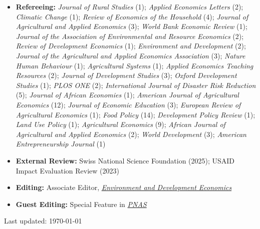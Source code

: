 \documentclass[letterpaper]{article}
\def\footerlink{}
\begin{document}
\begin{itemize}

\item \textbf{Refereeing:} \emph{Journal of Rural Studies} (1); \emph{Applied Economics Letters} (2); \emph{Climatic Change} (1); \emph{Review of Economics of the Household} (4); \emph{Journal of Agricultural and Applied Economics} (3); \emph{World Bank Economic Review} (1); \emph{Journal of the Association of Environmental and Resource Economics} (2); \emph{Review of Development Economics} (1); \emph{Environment and Development} (2); \emph{Journal of the Agricultural and Applied Economics Association} (3); \emph{Nature Human Behaviour} (1); \emph{Agricultural Systems} (1); \emph{Applied Economics Teaching Resources} (2); \emph{Journal of Development Studies} (3); \emph{Oxford Development Studies} (1); \emph{PLOS ONE} (2); \emph{International Journal of Disaster Risk Reduction} (5); \emph{Journal of African Economies} (1); \emph{American Journal of Agricultural Economics} (12); \emph{Journal of Economic Education} (3); \emph{European Review of Agricultural Economics} (1); \emph{Food Policy} (14); \emph{Development Policy Review} (1); \emph{Land Use Policy} (1); \emph{Agricultural Economics} (9); \emph{African Journal of Agricultural and Applied Economics} (2); \emph{World Development} (3); \emph{American Entrepreneurship Journal} (1)

\item \textbf{External Review:} Swiss National Science Foundation (2025); USAID Impact Evaluation Review (2023)

\item \textbf{Editing:} Associate Editor, \href{https://www.cambridge.org/core/journals/environment-and-development-economics}{\emph{Environment and Development Economics}}

\item \textbf{Guest Editing:} Special Feature in \href{https://www.pnas.org/}{\emph{PNAS}}



\end{itemize}

\bigskip

\begin{center}
\begin{footnotesize}
    Last updated: \today \\
   \href{\footerlink}{\texttt{\footerlink}}
\end{footnotesize}
\end{center}
\end{document}

